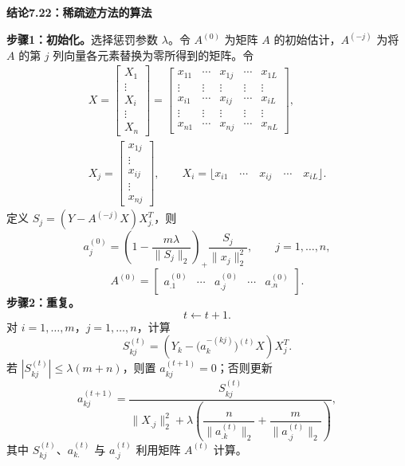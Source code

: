 \par\medskip{}\noindent\textbf{结论7.22：稀疏迹方法的算法}\par
\noindent\textbf{步骤1：初始化。}选择惩罚参数 $\lambda$。令 $A^{(0)}$ 为矩阵 $A$ 的初始估计，$A^{(-j)}$ 为将 $A$ 的第 $j$ 列向量各元素替换为零所得到的矩阵。令
\[
\begin{gathered}
X=\begin{bmatrix}X_1\\\vdots\\X_i\\\vdots\\X_n\end{bmatrix}
=\begin{bmatrix}x_{11}&\cdots&x_{1j}&\cdots&x_{1L}\\\vdots&\vdots&\vdots&\vdots&\vdots\\x_{i1}&\cdots&x_{ij}&\cdots&x_{iL}\\\vdots&\vdots&\vdots&\vdots&\vdots\\x_{n1}&\cdots&x_{nj}&\cdots&x_{nL}\end{bmatrix},\\
X_j=\begin{bmatrix}x_{1j}\\\vdots\\x_{ij}\\\vdots\\x_{nj}\end{bmatrix},\qquad
X_i=\lfloor x_{i1}\quad\cdots\quad x_{ij}\quad\cdots\quad x_{iL}\rfloor.
\end{gathered}
\]
定义 $S_j=(Y-A^{(-j)}X)X_{j.}^T$，则
\begin{equation}
a_j^{(0)}=\left(1-\frac{m\lambda}{\lVert S_j\rVert_2}\right)_+
\frac{S_j}{\lVert x_j\rVert_2^2},\qquad j=1,\ldots,n,
\tag{7.162}
\end{equation}
\[
A^{(0)}=\begin{bmatrix}a_{.1}^{(0)}&\cdots&a_{.j}^{(0)}&\cdots&a_{.n}^{(0)}\end{bmatrix}.
\]
\noindent\textbf{步骤2：重复。}
\[
t\leftarrow t+1.
\]
对 $i=1,\ldots,m$，$j=1,\ldots,n$，计算
\begin{equation}
S_{kj}^{(t)}=\left(Y_k-\bigl(a_k^{-(kj)}\bigr)^{(t)}X\right)X_j^T.
\tag{7.163}
\end{equation}
若 $|S_{kj}^{(t)}|\le\lambda(m+n)$，则置 $a_{kj}^{(t+1)}=0$；否则更新
\begin{equation}
a_{kj}^{(t+1)}=\frac{S_{kj}^{(t)}}{\lVert X_{.j}\rVert_2^2+
\lambda\left(\dfrac n{\lVert a_{.k}^{(t)}\rVert_2}+\dfrac m{\lVert a_{.j}^{(t)}\rVert_2}\right)},
\tag{7.164}
\end{equation}
其中 $S_{kj}^{(t)}$、$a_{k.}^{(t)}$ 与 $a_{.j}^{(t)}$ 利用矩阵 $A^{(t)}$ 计算。

